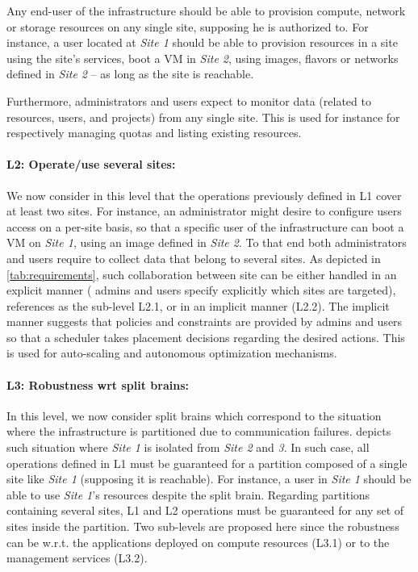 Any end-user of the infrastructure should be able to provision compute, network
or storage resources on any single site, supposing he is authorized to. For
instance, a user located at \emph{Site 1} should be able to provision resources
in a site using the site's services, \eg boot a VM in \emph{Site 2}, using
images, flavors or networks defined in \emph{Site 2} -- as long as the site is
reachable.

Furthermore, administrators and users expect to monitor data (\eg related to
resources, users, and projects) from any single site. This is used for instance
for respectively managing quotas and listing existing resources.

\paragraph{L2: Operate/use several sites:}
We now consider in this level that the operations previously defined in L1
cover at least two sites. For instance, an administrator might desire to
configure users access on a per-site basis, so that a specific user of the
infrastructure can boot a VM on \emph{Site 1}, using an image defined in
\emph{Site 2}. To that end both administrators and users require to collect
data that belong to several sites. As depicted in \cref{tab:requirements}, such
collaboration between site can be either handled in an explicit manner (\ie
admins and users specify explicitly which sites are targeted), references as
the sub-level L2.1, or in an implicit manner (L2.2). The implicit manner
suggests that policies and constraints are provided by admins and users so that
a scheduler takes placement decisions regarding the desired actions. This is
used for auto-scaling and autonomous optimization mechanisms.

\paragraph{L3: Robustness wrt split brains:}
In this level, we now consider split brains which correspond to the situation
where the infrastructure is partitioned due to communication failures.
 depicts such situation where \emph{Site 1} is isolated from
\emph{Site 2} and \emph{3}. In such case, all operations defined in L1 must be
guaranteed for a partition composed of a single site like \emph{Site 1}
(supposing it is reachable). For instance, a user in \emph{Site 1} should be
able to use \emph{Site 1}'s resources despite the split brain. Regarding
partitions containing several sites, L1 and L2 operations must be guaranteed
for any set of sites inside the partition.
Two sub-levels are proposed here since the robustness can be w.r.t. the
applications deployed on compute resources (L3.1) or to the management services
(L3.2).

